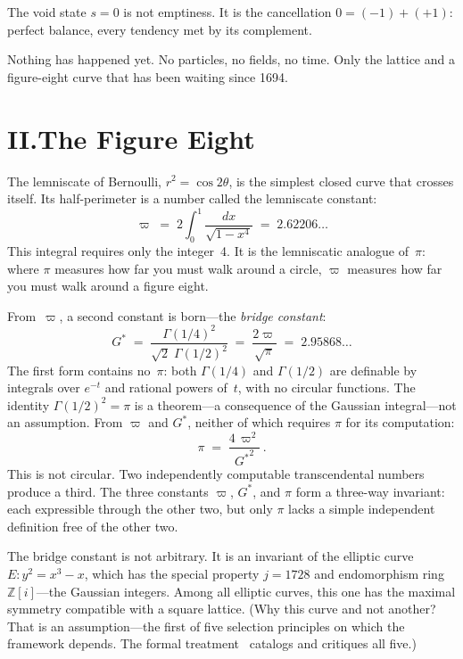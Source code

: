 \documentclass[11pt,a4paper]{article}
\newcommand{\Gstar}{{G^{*}}}
\newcommand{\vpi}{\varpi}
\begin{document}
The void state $s = 0$ is not emptiness. It is the cancellation $0 = (-1) + (+1)$: perfect balance, every tendency met by its complement.

Nothing has happened yet. No particles, no fields, no time. Only the lattice and a figure-eight curve that has been waiting since 1694.

\section*{II.\quad The Figure Eight}

The lemniscate of Bernoulli, $r^2 = \cos 2\theta$, is the simplest closed curve that crosses itself. Its half-perimeter is a number called the lemniscate constant:
\[
\vpi \;=\; 2\int_0^1 \frac{dx}{\sqrt{1 - x^4}} \;=\; 2.62206\ldots
\]
This integral requires only the integer~4. It is the lemniscatic analogue of~$\pi$: where $\pi$ measures how far you must walk around a circle, $\vpi$ measures how far you must walk around a figure eight.

From~$\vpi$, a second constant is born---the \emph{bridge constant}:
\[
\Gstar \;=\; \frac{\Gamma(1/4)^2}{\sqrt{2}\;\Gamma(1/2)^2} \;=\; \frac{2\vpi}{\sqrt{\pi}} \;=\; 2.95868\ldots
\]
The first form contains no~$\pi$: both $\Gamma(1/4)$ and $\Gamma(1/2)$ are definable by integrals over $e^{-t}$ and rational powers of~$t$, with no circular functions. The identity $\Gamma(1/2)^2 = \pi$ is a theorem---a consequence of the Gaussian integral---not an assumption. From $\vpi$ and $\Gstar$, neither of which requires $\pi$ for its computation:
\[
\pi \;=\; \frac{4\,\vpi^2}{\Gstar^2}\,.
\]
This is not circular. Two independently computable transcendental numbers produce a third. The three constants $\vpi$, $\Gstar$, and $\pi$ form a three-way invariant: each expressible through the other two, but only $\pi$ lacks a simple independent definition free of the other two.

The bridge constant is not arbitrary. It is an invariant of the elliptic curve $E: y^2 = x^3 - x$, which has the special property $j = 1728$ and endomorphism ring $\mathbb{Z}[i]$---the Gaussian integers. Among all elliptic curves, this one has the maximal symmetry compatible with a square lattice. (Why this curve and not another? That is an assumption---the first of five selection principles on which the framework depends. The formal treatment~\cite{formal} catalogs and critiques all five.)
\end{document}
